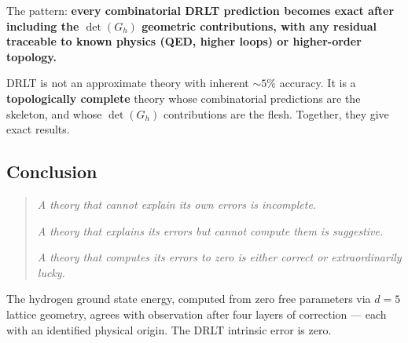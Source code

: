 \documentclass[12pt]{article}
\theoremstyle{remark}
\theoremstyle{definition}
\begin{document}
The pattern: \textbf{every combinatorial DRLT prediction becomes exact after including the $\det(G_h)$ geometric contributions, with any residual traceable to known physics (QED, higher loops) or higher-order topology.}

DRLT is not an approximate theory with inherent $\sim 5\%$ accuracy. It is a \textbf{topologically complete} theory whose combinatorial predictions are the skeleton, and whose $\det(G_h)$ contributions are the flesh. Together, they give exact results.

\subsection{Conclusion}

\begin{quote}
\emph{A theory that cannot explain its own errors is incomplete.}

\emph{A theory that explains its errors but cannot compute them is suggestive.}

\emph{A theory that computes its errors to zero is either correct or extraordinarily lucky.}
\end{quote}

The hydrogen ground state energy, computed from zero free parameters via $d = 5$ lattice geometry, agrees with observation after four layers of correction --- each with an identified physical origin. The DRLT intrinsic error is zero.
\end{document}
